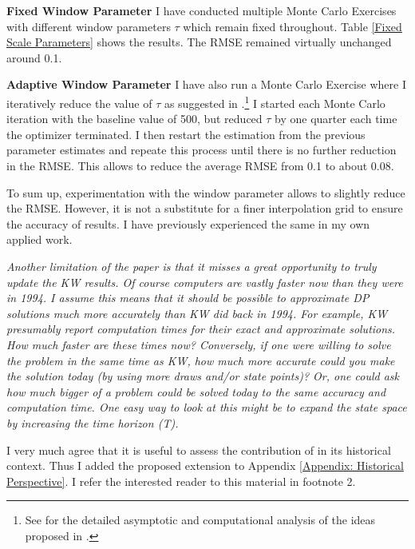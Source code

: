 \begin{boenumerate}
\begin{boenumerate}
\item \textbf{Fixed Window Parameter} I have conducted multiple Monte Carlo Exercises with different window parameters $\tau$ which remain fixed throughout. Table \ref{Fixed Scale Parameters} shows the results. The RMSE remained virtually unchanged around 0.1.



\item \textbf{Adaptive Window Parameter} I have also run a Monte Carlo Exercise where I iteratively reduce the value of $\tau$ as suggested in \citet{Keane.2003}.\footnote{See \citet{Bruins.2015} for the detailed asymptotic and computational analysis of the ideas proposed in \citet{Keane.2003}.} I started each Monte Carlo iteration with the baseline value of 500, but reduced $\tau$ by one quarter each time the optimizer terminated. I then restart the estimation from the previous parameter estimates and repeate this process until there is no further reduction in the RMSE. This allows to reduce the average RMSE from 0.1 to about 0.08.\newline
\end{boenumerate}

To sum up, experimentation with the window parameter allows to slightly reduce the RMSE. However, it is not a substitute for a finer interpolation grid to ensure the accuracy of results. I have previously experienced the same in my own applied work.\newline
\item \textit{Another limitation of the paper is that it misses a great opportunity to truly update the KW results. Of course computers are vastly faster now than they were in 1994. I assume this means that it should be possible to approximate DP solutions much more accurately than KW did back in 1994. For example, KW presumably report computation times for their exact and approximate solutions. How much faster are these times now? Conversely, if one were willing to solve the problem in the same time as KW, how much more accurate could you make the solution today (by using more draws and/or state points)? Or, one could ask how much bigger of a problem could be solved today to the same accuracy and computation time. One easy way to look at this might be to expand the state space by increasing the time horizon (T).}\vspace{0.5cm}

I very much agree that it is useful to assess the contribution of \citet{Keane.1994} in its historical context. Thus I added the proposed extension to Appendix \ref{Appendix: Historical Perspective}. I refer the interested reader to this material in footnote 2.
\end{boenumerate}
